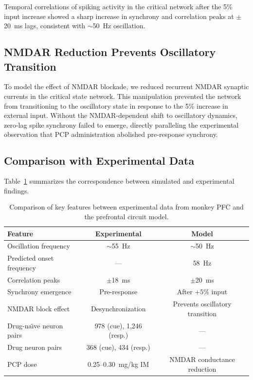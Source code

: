 \documentclass[10pt]{article}
\begin{document}
Temporal correlations of spiking activity in the critical network after the 5\% input increase showed a sharp increase in synchrony and correlation peaks at $\pm$20~ms lags, consistent with $\sim$50~Hz oscillation.

\subsection{NMDAR Reduction Prevents Oscillatory Transition}

To model the effect of NMDAR blockade, we reduced recurrent NMDAR synaptic currents in the critical state network. This manipulation prevented the network from transitioning to the oscillatory state in response to the 5\% increase in external input. Without the NMDAR-dependent shift to oscillatory dynamics, zero-lag spike synchrony failed to emerge, directly paralleling the experimental observation that PCP administration abolished pre-response synchrony.

\subsection{Comparison with Experimental Data}

Table~\ref{tab:comparison} summarizes the correspondence between simulated and experimental findings.

\begin{table}[htbp]
\centering
\caption{Comparison of key features between experimental data from monkey PFC \citep{zick2018blocking} and the prefrontal circuit model.}
\label{tab:comparison}
\begin{tabular}{lcc}
\toprule
Feature & Experimental & Model \\
\midrule
Oscillation frequency & $\sim$55~Hz & $\sim$50~Hz \\
Predicted onset frequency & --- & 58~Hz \\
Correlation peaks & $\pm$18~ms & $\pm$20~ms \\
Synchrony emergence & Pre-response & After $+5\%$ input \\
NMDAR block effect & Desynchronization & Prevents oscillatory transition \\
Drug-na\"{\i}ve neuron pairs & 978 (cue), 1{,}246 (resp.) & --- \\
Drug neuron pairs & 368 (cue), 434 (resp.) & --- \\
PCP dose & 0.25--0.30~mg/kg IM & NMDAR conductance reduction \\
\bottomrule
\end{tabular}
\end{table}
\end{document}
